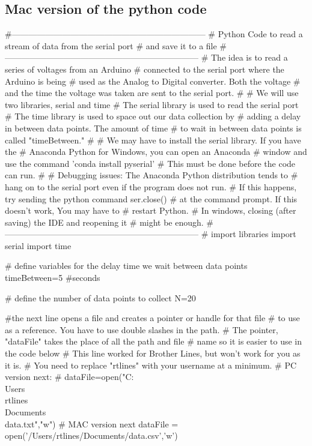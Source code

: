 \subsection{Mac version of the python code}
\begin{python}
#---------------------------------------------------------------------
# Python Code to read a stream of data from the serial port
#   and save it to a file
#---------------------------------------------------------------------
#   The idea is to read a series of voltages from an Arduino 
#   connected to the serial port where the Arduino is being 
#   used as the Analog to Digital converter. Both the voltage
#   and the time the voltage was taken are sent to the serial port.
#
# We will use two libraries, serial and time
#   The serial library is used to read the serial port
#   The time library is used to space out our data collection by
#   adding a delay in between data points. The amount of time 
#   to wait in between data points is called "timeBetween." 
#
# We may have to install the serial library. If you have the
#   Anaconda Python for Windows, you can open an Anaconda 
#   window and use the command 'conda install pyserial'
#   This must be done before the code can run.
#
# Debugging issues:  The Anaconda Python distribution tends to 
#   hang on to the serial port even if the program does not run. 
#   If this happens, try sending the python command ser.close()
#   at the command prompt. If this doesn't work, You may have to 
#   restart Python.
#   In windows, closing (after saving) the IDE and reopening it 
#   might be enough.
#---------------------------------------------------------------------
# import libraries
import serial
import time
 
# define variables for the delay time we wait between data points
timeBetween=5 #seconds
 
# define the number of data points to collect
N=20
 
#the next line opens a file and creates a pointer or handle for that file
#  to use as a reference. You have to use double slashes in the path.
#  The pointer, "dataFile" takes the place of all the path and file
#  name so it is easier to use in the code below
#  This line worked for Brother Lines, but won't work for you as it is.
#  You need to replace "rtlines" with your username at a minimum.
#  PC version next:
#  dataFile=open("C:\\Users\\rtlines\\Documents\\data.txt","w")
#  MAC version next
dataFile = open('/Users/rtlines/Documents/data.csv','w')


\end{python}
